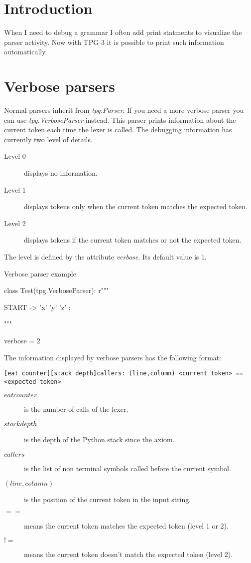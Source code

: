 \section{Introduction}          \label{debug}

When I need to debug a grammar I often add print statments to visualize the parser activity.
Now with TPG 3 it is possible to print such information automatically.

\section{Verbose parsers}

Normal parsers inherit from \emph{tpg.Parser}.
If you need a more verbose parser you can use \emph{tpg.VerboseParser} instead.
This parser prints information about the current token each time the lexer is called.
The debugging information has currently two level of details.

\begin{description}
    \item [Level 0] displays no information.
    \item [Level 1] displays tokens only when the current token matches the expected token.
    \item [Level 2] displays tokens if the current token matches or not the expected token.
\end{description}

The level is defined by the attribute \emph{verbose}. Its default value is 1.

\begin{code}
\caption{Verbose parser example}                            \label{debug:example}
\begin{verbatimtab}[4]
class Test(tpg.VerboseParser):
    r"""

    START -> 'x' 'y' 'z' ;

    """

    verbose = 2
\end{verbatimtab}
\end{code}

The information displayed by verbose parsers has the following format:
\begin{verbatim}
[eat counter][stack depth]callers: (line,column) <current token> == <expected token>
\end{verbatim}

\begin{description}
    \item [$eat counter$] is the number of calls of the lexer.
    \item [$stack depth$] is the depth of the Python stack since the axiom.
    \item [$callers$] is the list of non terminal symbols called before the current symbol.
    \item [$(line,column)$] is the position of the current token in the input string.
    \item [$==$] means the current token matches the expected token (level 1 or 2).
    \item [$!=$] means the current token doesn't match the expected token (level 2).
\end{description}
